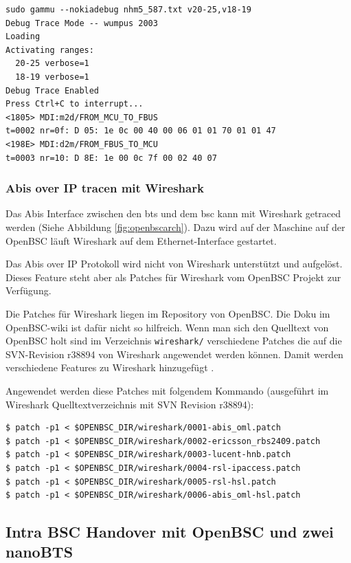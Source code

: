 \begin{lstlisting}[label=command:gammu,caption={Aufruf von Gammu}]
sudo gammu --nokiadebug nhm5_587.txt v20-25,v18-19
Debug Trace Mode -- wumpus 2003
Loading
Activating ranges:
  20-25 verbose=1
  18-19 verbose=1
Debug Trace Enabled
Press Ctrl+C to interrupt...
<1805> MDI:m2d/FROM_MCU_TO_FBUS
t=0002 nr=0f: D 05: 1e 0c 00 40 00 06 01 01 70 01 01 47 
<198E> MDI:d2m/FROM_FBUS_TO_MCU
t=0003 nr=10: D 8E: 1e 00 0c 7f 00 02 40 07 
\end{lstlisting}

\subsubsection{Abis over IP tracen mit Wireshark}\label{sec:abistrace}
Das Abis Interface zwischen den \gls{bts} und dem \gls{bsc} kann mit Wireshark getraced werden (Siehe Abbildung \ref{fig:openbscarch}). Dazu wird auf der Maschine auf der OpenBSC läuft Wireshark auf dem Ethernet-Interface gestartet.

Das Abis over IP Protokoll wird nicht von Wireshark unterstützt und aufgelöst. Dieses Feature steht aber als Patches für Wireshark vom OpenBSC Projekt zur Verfügung.

Die Patches für Wireshark liegen im Repository von OpenBSC. Die Doku im OpenBSC-wiki ist dafür nicht so hilfreich. Wenn man sich den Quelltext von OpenBSC holt sind im Verzeichnis \lstinline{wireshark/} verschiedene Patches die auf die SVN-Revision r38894 von Wireshark angewendet werden können. Damit werden verschiedene Features zu Wireshark hinzugefügt \cite{bib:wiresharkabis, bib:wiresharkabisreadme}.

Angewendet werden diese Patches mit folgendem Kommando (ausgeführt im Wireshark Quelltextverzeichnis mit SVN Revision r38894):
\begin{lstlisting}[caption={Patchen von Wireshark}]
$ patch -p1 < $OPENBSC_DIR/wireshark/0001-abis_oml.patch
$ patch -p1 < $OPENBSC_DIR/wireshark/0002-ericsson_rbs2409.patch
$ patch -p1 < $OPENBSC_DIR/wireshark/0003-lucent-hnb.patch
$ patch -p1 < $OPENBSC_DIR/wireshark/0004-rsl-ipaccess.patch
$ patch -p1 < $OPENBSC_DIR/wireshark/0005-rsl-hsl.patch
$ patch -p1 < $OPENBSC_DIR/wireshark/0006-abis_oml-hsl.patch 
\end{lstlisting}

\subsection{Intra BSC Handover mit OpenBSC und zwei nanoBTS}

